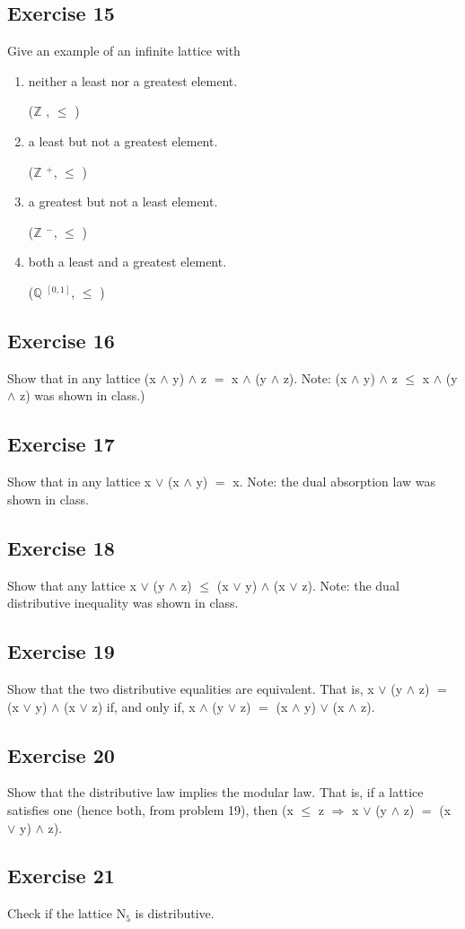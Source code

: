 \documentclass{article}
\newcommand{\mt}[1]{\ensuremath{#1}}
\newcommand\ssc[2][\DefaultOpt]{%
  \def\DefaultOpt{#2}%
  \subsection[#1]{#2}%
}
\newcommand{\balist}{\begin{enumerate}[label=\alph*.]}
\newcommand{\elist}{\end{enumerate}}
\newcommand{\bq}{\mt{\mathbb{Q}} }       %
\newcommand{\bz}{\mt{\mathbb{Z}} }       %
\newcommand{\rar}{ \mt{\Rightarrow} }     %
\newcommand{\lse}{\mt{\leq} }
\newcommand{\eql}{\mt{=} }
\newcommand{\uw}[2]{#1\mt{_{#2}}}
\newcommand{\uf}[2]{#1\mt{^{#2}}}
\newcommand{\lgnd}{\mt{\land} }
\newcommand{\lgor}{\mt{\lor} }
\begin{document}
\ssc{Exercise 15}{

Give an example of an infinite lattice with 

\balist
\item neither a least nor a greatest element.

(\bz, \lse)

\item a least but not a greatest element.

(\uf{\bz}{+}, \lse)

\item a greatest but not a least element.

(\uf{\bz}{-}, \lse)

\item both a least and a greatest element.

(\uf{\bq}{[0, 1]}, \lse)

\elist

}

\ssc{Exercise 16}{

Show that in any lattice (x \lgnd y) \lgnd z \eql x \lgnd (y \lgnd z). Note: (x \lgnd y) \lgnd z \lse x \lgnd (y \lgnd z) was shown in class.)

}

\ssc{Exercise 17}{

Show that in any lattice x \lgor (x \lgnd y) \eql x. Note: the dual absorption law was shown in class.

}

\ssc{Exercise 18}{

Show that any lattice x \lgor (y \lgnd z) \lse (x \lgor y) \lgnd (x \lgor z). Note: the dual distributive inequality was shown in class.

}

\ssc{Exercise 19}{

Show that the two distributive equalities are equivalent. That is, x \lgor (y \lgnd z) \eql (x \lgor y) \lgnd (x \lgor z) if, and only if, x \lgnd (y \lgor z) \eql (x \lgnd y) \lgor (x \lgnd z).

}

\ssc{Exercise 20}{

Show that the distributive law implies the modular law. That is, if a lattice satisfies one (hence both, from problem 19), then (x \lse z \rar x \lgor (y \lgnd z) \eql (x \lgor y) \lgnd z).

}

\ssc{Exercise 21}{

Check if the lattice \uw{N}{5} is distributive.

}
\end{document}
